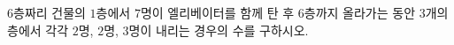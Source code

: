 \hspace*{2mm}\begin{minipage}[t]{\dimexpr\linewidth-2mm\relax}\vspace{0pt}
$6$층짜리 건물의 $1$층에서 $7$명이 엘리베이터를 함께 탄 후 $6$층까지 올라가는 동안 $3$개의 층에서 각각 $2$명, $2$명, $3$명이 내리는 경우의 수를 구하시오. \end{minipage}
